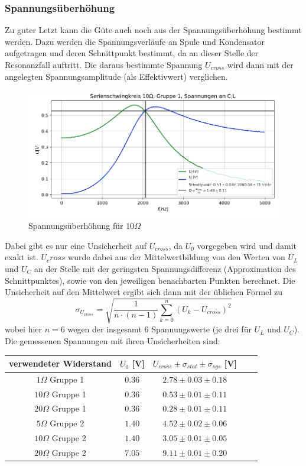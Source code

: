 \documentclass[a4paper, 11pt]{article}
\begin{document}
\subsubsection{Spannungsüberhöhung}
Zu guter Letzt kann die Güte auch noch aus der Spannungsüberhöhung bestimmt werden. Dazu werden die Spannungsverläufe an Spule und Kondensator aufgetragen und deren Schnittpunkt bestimmt, da an dieser Stelle der Resonanzfall auftritt. Die daraus bestimmte Spannung $U_{cross}$ wird dann mit der angelegten Spannungsamplitude (als Effektivwert) verglichen.  \\
\begin{figure}[H]
	\centering
	\includegraphics[trim = 0mm 0mm 0mm 0mm,clip, width=13cm]{Bilder/Selection_G1-10Ohm-U.jpg}%
	\caption[Spannungsüberhöhung für $ 10 \Omega$]{Spannungsüberhöhung für $ 10 \Omega$}%
	\label{pic:Abbildung 3}%
\end{figure}
Dabei gibt es nur eine Unsicherheit auf $U_{cross}$, da $U_0$ vorgegeben wird und damit exakt ist.
$U_cross$ wurde dabei aus der Mittelwertbildung von den Werten von $U_L$ und $U_C$ an der Stelle mit der geringsten Spannungsdifferenz (Approximation des Schnittpunktes), sowie von den jeweiligen benachbarten Punkten berechnet. Die Unsicherheit auf den Mittelwert ergibt sich dann mit der üblichen Formel zu \[ \sigma_{U_{cross}} = \sqrt{\frac{1}{n \cdot (n-1)} \sum_{k=0}^n (U_k - U_{cross})^2} \] wobei hier $n = 6$ wegen der insgesamt 6 Spannungswerte (je drei für $U_L$ und $U_C$).
Die gemessenen Spannungen mit ihren Unsicherheiten sind:
\begin{center}
\renewcommand{\arraystretch}{1.5}
\begin{tabular}{|c|c|c|c|c|}
\hline verwendeter Widerstand	&	$U_0$ [V]	&	$U_{cross} \pm \sigma_{stat} \pm \sigma_{sys}$	[V]	\\
\hline $  1\Omega$ Gruppe 1	&	$  0.36 $		&	$ 2.78 \pm 0.03 \pm 0.18$		\\
\hline $ 10\Omega$ Gruppe 1	&	$  0.36 $		&	$ 0.53 \pm 0.01 \pm 0.11$		\\
\hline $ 20\Omega$ Gruppe 1	&	$  0.36 $		&	$ 0.28 \pm 0.01 \pm 0.11$		\\
\hline $  5\Omega$ Gruppe 2	&	$  1.40 $		&	$ 4.52 \pm 0.02 \pm 0.06$		\\
\hline $ 10\Omega$ Gruppe 2	&	$  1.40 $		&	$ 3.05 \pm 0.01 \pm 0.05$		\\
\hline $ 20\Omega$ Gruppe 2	&	$  7.05 $		&	$ 9.11 \pm 0.01 \pm 0.20$		\\
\hline
\end{tabular}
\end{center}
\end{document}
